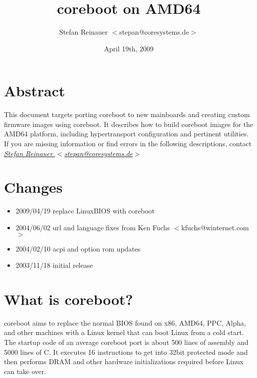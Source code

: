 \documentclass[titlepage,12pt]{article}
\title{coreboot on AMD64}
\author{Stefan Reinauer $<$stepan@coresystems.de$>$}
\date{April 19th, 2009}
\begin{document}
\maketitle

\thispagestyle{empty}

\tableofcontents

\newpage

%
%

\section{Abstract}

This document targets porting coreboot to new mainboards and creating
custom firmware images using coreboot. It describes how to build
coreboot images for the AMD64 platform, including hypertransport
configuration and pertinent utilities. If you are missing information or
find errors in the following descriptions, contact
\href{mailto:stepan@coresystems.de}{\textit{Stefan Reinauer $<$stepan@coresystems.de$>$}}


%
%

\section{Changes}
 \begin{itemize}
 \item 2009/04/19 replace LinuxBIOS with coreboot
 \item 2004/06/02 url and language fixes from Ken Fuchs $<$kfuchs@winternet.com$>$
 \item 2004/02/10 acpi and option rom updates
 \item 2003/11/18 initial release
 \end{itemize}



%
%

\section{What is coreboot?}

coreboot aims to replace the normal BIOS found on x86, AMD64, PPC,
Alpha, and other machines with a Linux kernel that can boot Linux from a cold
start. The startup code of an average coreboot port is about 500 lines of
assembly and 5000 lines of C. It executes 16 instructions to get into 32bit
protected mode and then performs DRAM and other hardware initializations
required before Linux can take over.
\end{document}
